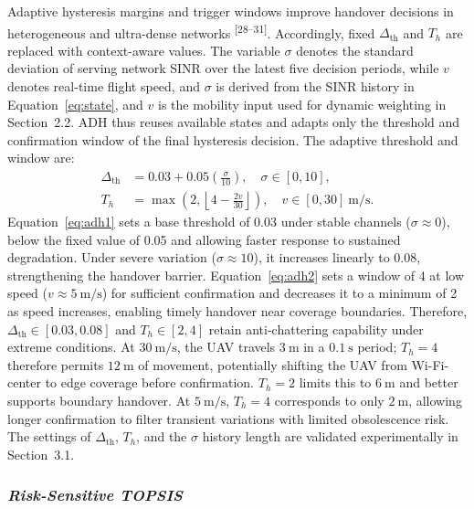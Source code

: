 \documentclass[10pt,a4paper]{article}
\newcommand{\upcite}[1]{\textsuperscript{[#1]}}
\begin{document}
Adaptive hysteresis margins and trigger windows improve handover decisions in heterogeneous and ultra-dense networks \upcite{28--31}. Accordingly, fixed $\Delta_{\mathrm{th}}$ and $T_h$ are replaced with context-aware values. The variable $\sigma$ denotes the standard deviation of serving network SINR over the latest five decision periods, while $v$ denotes real-time flight speed, and $\sigma$ is derived from the SINR history in Equation~\eqref{eq:state}, and $v$ is the mobility input used for dynamic weighting in Section~2.2. ADH thus reuses available states and adapts only the threshold and confirmation window of the final hysteresis decision. The adaptive threshold and window are:
\begin{align}
\Delta_{\mathrm{th}} &= 0.03+0.05\left(\frac{\sigma}{10}\right),\quad \sigma\in[0,10], \label{eq:adh1}\\
T_h &= \max\left(2,\left\lfloor4-\frac{2v}{30}\right\rfloor\right),\quad v\in[0,30]~\mathrm{m/s}. \label{eq:adh2}
\end{align}
Equation~\eqref{eq:adh1} sets a base threshold of 0.03 under stable channels ($\sigma\approx0$), below the fixed value of 0.05 and allowing faster response to sustained degradation. Under severe variation ($\sigma\approx10$), it increases linearly to 0.08, strengthening the handover barrier. Equation~\eqref{eq:adh2} sets a window of 4 at low speed ($v\approx5~\mathrm{m/s}$) for sufficient confirmation and decreases it to a minimum of 2 as speed increases, enabling timely handover near coverage boundaries. Therefore, $\Delta_{\mathrm{th}}\in[0.03,0.08]$ and $T_h\in[2,4]$ retain anti-chattering capability under extreme conditions. At $30~\mathrm{m/s}$, the UAV travels $3~\mathrm{m}$ in a $0.1~\mathrm{s}$ period; $T_h=4$ therefore permits $12~\mathrm{m}$ of movement, potentially shifting the UAV from Wi-Fi-center to edge coverage before confirmation. $T_h=2$ limits this to $6~\mathrm{m}$ and better supports boundary handover. At $5~\mathrm{m/s}$, $T_h=4$ corresponds to only $2~\mathrm{m}$, allowing longer confirmation to filter transient variations with limited obsolescence risk. The settings of $\Delta_{\mathrm{th}}$, $T_h$, and the $\sigma$ history length are validated experimentally in Section~3.1.

\subsubsection{\textmd{\textit{Risk-Sensitive TOPSIS}}}
\end{document}
